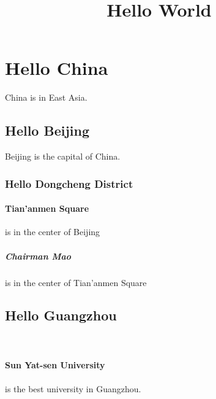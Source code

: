 \documentclass{article}
\title{Hello World}
\begin{document}
	\maketitle
	\section{Hello China} China is in East Asia.
		\subsection{Hello Beijing} Beijing is the capital of China.
			\subsubsection{Hello Dongcheng District}
				\paragraph{Tian'anmen Square}is in the center of Beijing
					\subparagraph{Chairman Mao} is in the center of Tian'anmen Square 
		\subsection{Hello Guangzhou} 
			\paragraph{Sun Yat-sen University} is the best university in Guangzhou. 
\end{document}
